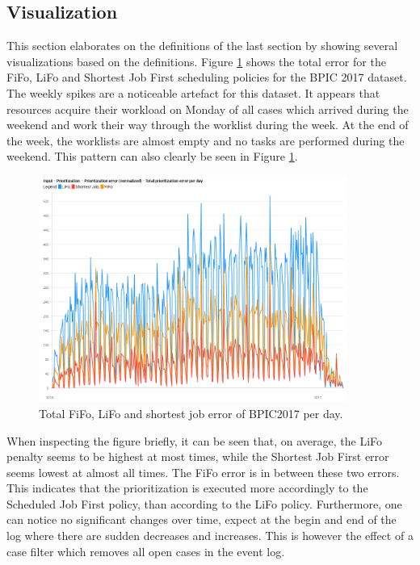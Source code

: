 \subsection{Visualization}
This section elaborates on the definitions of the last section by showing several visualizations based on the definitions. Figure \ref{fig:error_total} shows the total error for the FiFo, LiFo and Shortest Job First scheduling policies for the BPIC 2017 dataset. The weekly spikes are a noticeable artefact for this dataset. It appears that resources acquire their workload on Monday of all cases which arrived during the weekend and work their way through the worklist during the week. At the end of the week, the worklists are almost empty and no tasks are performed during the weekend. This pattern can also clearly be seen in Figure \ref{fig:error_total}.

\begin{figure}[h]
	\centering
    \includegraphics[width=0.9\textwidth]{figures/total_prioritization_error.png}
    \caption{Total FiFo, LiFo and shortest job error of BPIC2017 per day.}
    \label{fig:error_total}
\end{figure}

When inspecting the figure briefly, it can be seen that, on average, the LiFo penalty seems to be highest at most times, while the Shortest Job First error seems lowest at almost all times. The FiFo error is in between these two errors. This indicates that the prioritization is executed more accordingly to the Scheduled Job First policy, than according to the LiFo policy. Furthermore, one can notice no significant changes over time, expect at the begin and end of the log where there are sudden decreases and increases. This is however the effect of a case filter which removes all open cases in the event log. 

